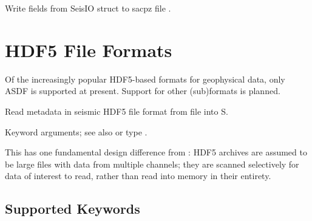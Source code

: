 \documentclass[letterpaper,11pt,english]{sphinxmanual}
\begin{document}
\begin{fulllineitems}
\label{\detokenize{src/Formats/metadata:writesacpz}}
\end{fulllineitems}


Write fields from SeisIO struct  to sacpz file .


\section{HDF5 File Formats}
\label{\detokenize{src/Formats/hdf5:hdf5-file-formats}}\label{\detokenize{src/Formats/hdf5::doc}}
Of the increasingly popular HDF5-based formats for geophysical data, only ASDF
is supported at present. Support for other (sub)formats is planned.


\begin{fulllineitems}
\end{fulllineitems}



\begin{fulllineitems}
\end{fulllineitems}


\begin{DUlineblock}{0em}
\item[] Read metadata in seismic HDF5 file format from file  into S.
\item[] 
\item[] 
\item[] Keyword arguments; see also {\hyperref[\detokenize{src/Appendices/keywords:dkw}]{}} or type .
\end{DUlineblock}

This has one fundamental design difference from {\hyperref[\detokenize{src/Formats/timeseries:readdata}]{}}:
HDF5 archives are assumed to be large files with data from multiple channels;
they are scanned selectively for data of interest to read, rather than read
into memory in their entirety.


\subsection{Supported Keywords}
\label{\detokenize{src/Formats/hdf5:supported-keywords}}
\end{document}
